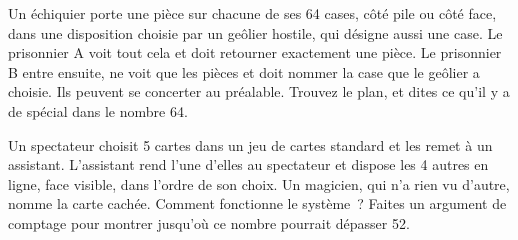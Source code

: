 \begin{question}\label{iq:iv1:logic-riddles:34}
Un échiquier porte une pièce sur chacune de ses 64 cases, côté pile ou côté face, dans une disposition choisie par un geôlier hostile, qui désigne aussi une case. Le prisonnier A voit tout cela et doit retourner exactement une pièce. Le prisonnier B entre ensuite, ne voit que les pièces et doit nommer la case que le geôlier a choisie. Ils peuvent se concerter au préalable. Trouvez le plan, et dites ce qu'il y a de spécial dans le nombre 64.
\end{question}

\begin{question}\label{iq:iv1:logic-riddles:35}
Un spectateur choisit 5 cartes dans un jeu de cartes standard et les remet à un assistant. L'assistant rend l'une d'elles au spectateur et dispose les 4 autres en ligne, face visible, dans l'ordre de son choix. Un magicien, qui n'a rien vu d'autre, nomme la carte cachée. Comment fonctionne le système~? Faites un argument de comptage pour montrer jusqu'où ce nombre pourrait dépasser 52.
\end{question}
